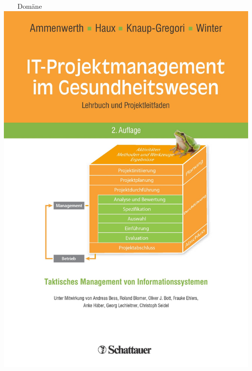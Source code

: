\documentclass[aspectratio=1610,12pt]{beamer}
\begin{document}
\begin{frame}[plain]{~~~~Domäne}
\centering\includegraphics[height=0.77\textheight,keepaspectratio]{img/book-ob.jpg}

\end{frame}
\end{document}
